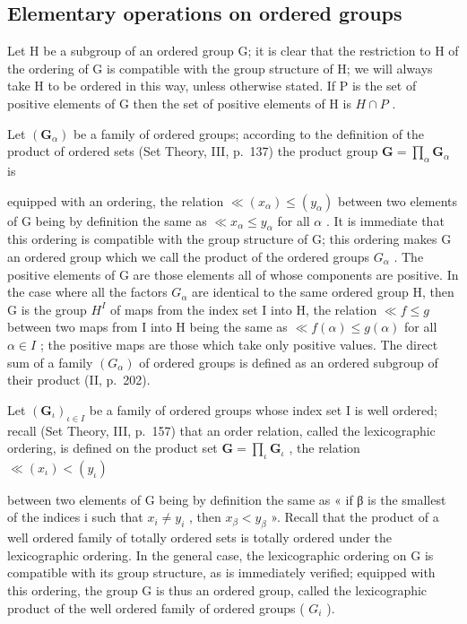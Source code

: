 \subsection{Elementary operations on ordered groups}

Let H be a subgroup of an ordered group G; it is clear that the restriction to H of the ordering of G is compatible with the group structure of H; we will always take H to be ordered in this way, unless otherwise stated. If P is the set of positive elements of G then the set of positive elements of H is \(H \cap P\) .

Let \((\mathbf{G}_{\alpha})\) be a family of ordered groups; according to the definition of the product of ordered sets (Set Theory, III, p.~137) the product group \(\mathbf{G} = \prod_{\alpha}\mathbf{G}_{\alpha}\) is

equipped with an ordering, the relation \(\ll (x_{\alpha}) \leqslant (y_{\alpha})\) between two elements of G being by definition the same as \(\ll x_{\alpha} \leqslant y_{\alpha}\) for all \(\alpha\) . It is immediate that this ordering is compatible with the group structure of G; this ordering makes G an ordered group which we call the product of the ordered groups \(G_{\alpha}\) . The positive elements of G are those elements all of whose components are positive. In the case where all the factors \(G_{\alpha}\) are identical to the same ordered group H, then G is the group \(H^{I}\) of maps from the index set I into H, the relation \(\ll f \leqslant g\) between two maps from I into H being the same as \(\ll f(\alpha) \leqslant g(\alpha)\) for all \(\alpha \in I\) ; the positive maps are those which take only positive values. The direct sum of a family \((G_{\alpha})\) of ordered groups is defined as an ordered subgroup of their product (II, p.~202).

Let \((\mathbf{G}_{\iota})_{\iota \in I}\) be a family of ordered groups whose index set I is well ordered; recall (Set Theory, III, p.~157) that an order relation, called the lexicographic ordering, is defined on the product set \(\mathbf{G} = \prod_{\iota} \mathbf{G}_{\iota}\) , the relation \(\ll (x_{\iota}) < (y_{\iota})\)

between two elements of G being by definition the same as « if β is the smallest of the indices i such that \(x_{i} \neq y_{i}\) , then \(x_{\beta} < y_{\beta}\) ». Recall that the product of a well ordered family of totally ordered sets is totally ordered under the lexicographic ordering. In the general case, the lexicographic ordering on G is compatible with its group structure, as is immediately verified; equipped with this ordering, the group G is thus an ordered group, called the lexicographic product of the well ordered family of ordered groups ( \(G_{i}\) ).

